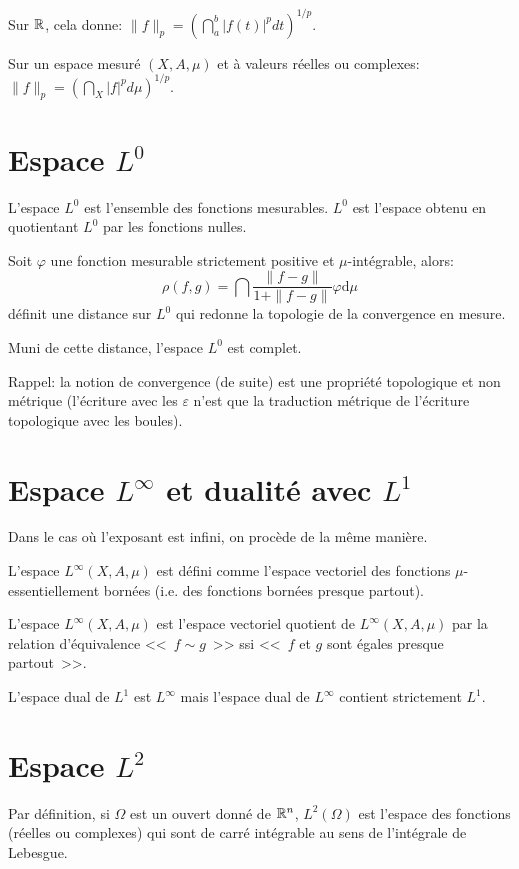 Sur $\mathbb R$, cela donne: $\|f\|_p=\left(\dint_a^b |f(t)|^pdt\right)^{1/p}$.

Sur un espace mesuré $(X,A,\mu)$ et à valeurs réelles ou complexes: $\|f\|_p=\left(\dint_X |f|^pd\mu\right)^{1/p}$.

\medskip
\section{Espace $L^0$}
L'espace $L^0$ est l'ensemble des fonctions mesurables.
$L^0$ est l'espace obtenu en quotientant $L^0$ par les fonctions nulles.

\medskip
Soit $\varphi$ une fonction mesurable strictement positive et $\mu$-intégrable, alors:
\begin{equation}
\rho(f,g)=\dint \frac{\|f-g\|}{1+\|f-g\|} \varphi \mathrm d\mu
\end{equation}
définit une distance sur $L^0$ qui redonne la topologie de la convergence en mesure.

Muni de cette distance, l'espace $L^0$ est complet.

\medskip
Rappel: la notion de convergence (de suite) est une propriété topologique et non
métrique (l'écriture avec les $\varepsilon$ n'est que la traduction métrique
de l'écriture topologique avec les boules).

\medskip
\section{Espace $L^\infty$ et dualité avec $L^1$}
Dans le cas où l'exposant est infini, on procède de la même manière.

\medskip
L'espace $L^\infty(X,A,\mu)$ est défini comme l'espace vectoriel des fonctions
$\mu$-essentiellement bornées (i.e. des fonctions bornées presque partout).

L'espace $L^\infty(X,A,\mu)$ est l'espace vectoriel quotient de $L^\infty(X,A,\mu)$
par la relation d'équivalence <<~$f \sim g$~>> ssi <<~$f$ et $g$ sont égales presque partout~>>.

\medskip
L'espace dual de $L^1$ est $L^{\infty}$ mais l'espace dual de $L^{\infty}$ contient strictement $L^1$.

\medskip
\section{Espace $L^2$}

Par définition, si $\Omega$ est un ouvert donné de $\mathbb R^n$, $L^2(\Omega)$ est l'espace des
fonctions (réelles ou complexes) qui sont  de carré intégrable au sens de l'intégrale de Lebesgue.


